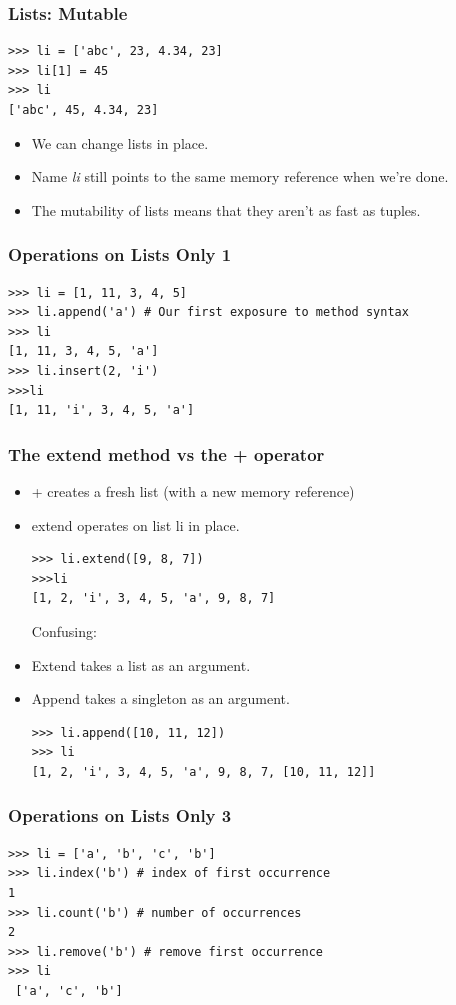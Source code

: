 \documentclass[12pt,handout]{beamer}
\begin{document}
\begin{frame}[fragile]
\frametitle{Lists: Mutable}
\small{
\begin{verbatim}
>>> li = ['abc', 23, 4.34, 23]
>>> li[1] = 45
>>> li
['abc', 45, 4.34, 23]
\end{verbatim}
}
\begin{itemize}
\item We can change lists in place.
\item Name {\it li} still points to the same memory reference when we're
done.
\item The mutability of lists means that they aren't as fast as tuples.
\end{itemize}
\end{frame}



\begin{frame}[fragile]
\frametitle{Operations on Lists Only 1}
\small{
\begin{verbatim}
>>> li = [1, 11, 3, 4, 5]
>>> li.append('a') # Our first exposure to method syntax
>>> li
[1, 11, 3, 4, 5, 'a']
>>> li.insert(2, 'i')
>>>li
[1, 11, 'i', 3, 4, 5, 'a']
\end{verbatim}
}
\end{frame}

\begin{frame}[fragile]
\frametitle{The extend method vs the + operator}
\begin{itemize}
\item + creates a fresh list (with a new memory reference)
\item extend operates on list li in place.

\small{
\begin{verbatim}
>>> li.extend([9, 8, 7])
>>>li
[1, 2, 'i', 3, 4, 5, 'a', 9, 8, 7]
\end{verbatim}
}

Confusing:
\item Extend takes a list as an argument.
\item Append takes a singleton as an argument.

\small{
\begin{verbatim}
>>> li.append([10, 11, 12])
>>> li
[1, 2, 'i', 3, 4, 5, 'a', 9, 8, 7, [10, 11, 12]]
\end{verbatim}
}

\end{itemize}
\end{frame}

\begin{frame}[fragile]
\frametitle{Operations on Lists Only 3}
\small{
\begin{verbatim}
>>> li = ['a', 'b', 'c', 'b']
>>> li.index('b') # index of first occurrence
1
>>> li.count('b') # number of occurrences
2
>>> li.remove('b') # remove first occurrence
>>> li
 ['a', 'c', 'b']
\end{verbatim}
}
\end{frame}
\end{document}
